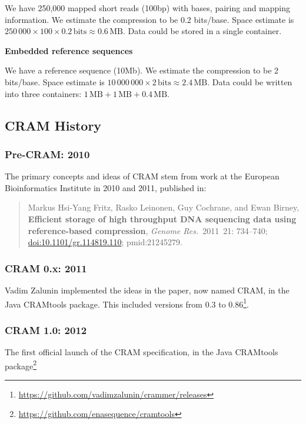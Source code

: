 \documentclass[a4paper]{article}
\newcommand\bits{\,\mbox{bits}}
\newcommand\MB{\,\mbox{MB}}
\begin{document}
We have 250,000 mapped short reads (100bp) with bases, pairing and mapping information. 
We estimate the compression to be 0.2 bits/base. Space estimate is $250\,000 \times 100
\times 0.2 \bits \approx 0.6 \MB$. Data could be stored in a single
container.

\textbf{Embedded reference sequences}

We have a reference sequence (10Mb). We estimate the compression to be 2 bits/base. 
Space estimate is $10\,000\,000 \times 2 \bits \approx 2.4 \MB$. Data
could be written into three containers: $1\MB + 1\MB + 0.4\MB$.

\newpage

\subsection{CRAM History}

\subsubsection*{Pre-CRAM: 2010}

The primary concepts and ideas of CRAM stem from work at the European
Bioinformatics Institute in 2010 and 2011, published in:

\begin{quote}\small
Markus Hsi-Yang Fritz,
Rasko Leinonen, Guy Cochrane, and Ewan Birney,
\textbf{Efficient storage of high throughput DNA sequencing data using reference-based compression},
{\sl Genome Res.}~2011~21: 734--740;
\href{http://dx.doi.org/doi:10.1101/gr.114819.110}{doi:10.1101/gr.114819.110};
{\sc pmid:}21245279.
\end{quote}

\subsubsection*{CRAM 0.x: 2011}

Vadim Zalunin implemented the ideas in the paper, now named CRAM, in
the Java CRAMtools package.  This included versions from 0.3 to 0.86\footnote{\url{https://github.com/vadimzalunin/crammer/releases}}.

\subsubsection*{CRAM 1.0: 2012}

The first official launch of the CRAM specification, in the Java
CRAMtools package\footnote{\url{https://github.com/enasequence/cramtools}}
\end{document}
